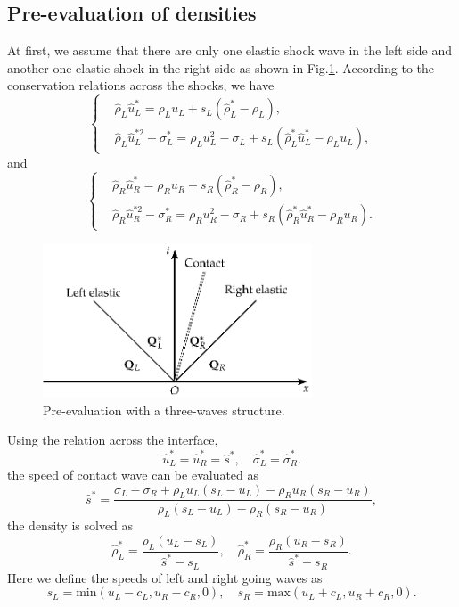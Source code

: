 \documentclass[review]{elsarticle}
\begin{document}
\subsection{Pre-evaluation of densities}\label{sec:eva}
At first, we assume that there are only one elastic shock wave in the left side and another one  elastic shock in the right side as shown in Fig.\ref{fig:HLLC}. According to the conservation relations across the shocks, we have    
\begin{equation}
  \left\{
  \begin{aligned}
	&\hat{\rho}_L\hat{u}^*_L = \rho_L u_L +s_L(\hat{\rho}_L^*-\rho_L), \\
	&\hat{\rho}_L\hat{u}_L^{*2}-\sigma_L^* = \rho_L u_L^2 -\sigma_L +s_L(\hat{\rho}_L^* \hat{u}_L^*-\rho_L u_L), 
  \end{aligned}
\right.
\end{equation}
and
\begin{equation}
  \left\{
  \begin{aligned}
	&\hat{\rho}_R\hat{u}^*_R = \rho_R u_R +s_R(\hat{\rho}_R^*-\rho_R), \\
	&\hat{\rho}_R\hat{u}_R^{*2}-\sigma_R^* = \rho_R u_R^2 -\sigma_R +s_R(\hat{\rho}_R^* \hat{u}_R^*-\rho_R u_R). 
  \end{aligned}
\right.
\end{equation}
\begin{figure}
  \centering
  \includegraphics[width=8cm]{Tikz-figure7.eps}
  \caption{Pre-evaluation with a three-waves structure.}
  \label{fig:HLLC}
\end{figure}


Using the relation across the interface,
\begin{equation}
  \hat{u}_L^* = \hat{u}_R^* =\hat{s}^*,\quad \hat{\sigma}_L^* = \hat{\sigma}_R^*.
\end{equation}
the speed of contact wave can be evaluated as 
\begin{equation}
\hat{s}^* = \frac{\sigma_L-\sigma_R+\rho_L u_L(s_L-u_L)-\rho_R u_R(s_R-u_R)}{\rho_L(s_L-u_L)-\rho_R(s_R-u_R)},
\end{equation}
the density is solved as 
\begin{equation}
\hat{\rho}_L^* = \frac{\rho_L(u_L-s_L)}{\hat{s}^*-s_L}, \quad
\hat{\rho}_R^* = \frac{\rho_R(u_R-s_R)}{\hat{s}^*-s_R}.
\end{equation}
Here we define the speeds of left and right going waves as
 \begin{equation}
      s_L = \text{min} (u_L-c_L, u_R-c_R, 0),  \quad s_R = \text{max}(u_L+c_L, u_R+c_R, 0).
\end{equation}
\end{document}
